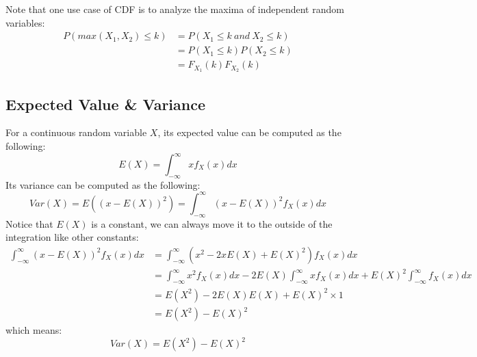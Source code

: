 \documentclass[11pt]{article}
\begin{document}
Note that one use case of CDF is to analyze the maxima of independent random variables:
\begin{align*}
  P(max(X_1, X_2) \leq k) &= P(X_1 \leq k \: and \: X_2 \leq k) 
  \\ &= P(X_1 \leq k) P(X_2 \leq k)
  \\ &= F_{X_1}(k)F_{X_2}(k)
\end{align*}

\subsection{Expected Value \& Variance}
For a continuous random variable $X$, its expected value can be computed as the following:
$$E(X) = \int_{-\infty}^{\infty} xf_X(x) dx$$
\noindent Its variance can be computed as the following:
$$Var(X) = E((x - E(X))^2) = \int_{-\infty}^{\infty} (x - E(X))^2 f_X(x) dx$$
Notice that $E(X)$ is a constant, we can always move it to the outside of the integration like other constants:
\begin{align*}
  \int_{-\infty}^{\infty} (x - E(X))^2 f_X(x) dx &= \int_{-\infty}^{\infty} (x^2 - 2xE(X) + E(X)^2) f_X(x) dx 
  \\ &= \int_{-\infty}^{\infty} x^2 f_X(x) dx - 2E(X) \int_{-\infty}^{\infty} xf_X(x)dx + E(X)^2 \int_{-\infty}^{\infty} f_X(x)dx
  \\ &= E(X^2) - 2E(X) E(X) + E(X)^2 \times 1
  \\ &= E(X^2) - E(X)^2
\end{align*}
which means:
$$Var(X) = E(X^2) - E(X)^2$$
\end{document}

